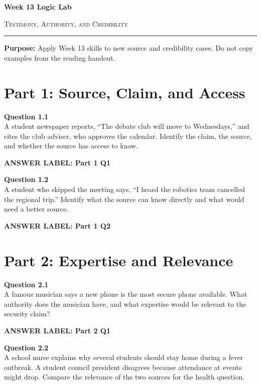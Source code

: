 \documentclass[12pt]{article}
\newcommand{\answerbox}[2]{%
\vspace{0.15em}
\noindent\textbf{#1}\par
\vspace{0.05em}
\noindent\fbox{%
\begin{minipage}[t][#2]{\dimexpr\textwidth-2\fboxsep-2\fboxrule}
\rule{\textwidth}{0pt}
\vspace{#2}
\end{minipage}
}\par
\vspace{0.25em}
}
\begin{document}
\begin{center}
{\LARGE\bfseries Week 13 Logic Lab}\par\vspace{0.05em}
{\large\scshape Testimony, Authority, and Credibility}\par\vspace{0.1em}
\rule{0.78\textwidth}{0.5pt}\par\vspace{0.15em}
\end{center}

\noindent\textbf{Purpose:} Apply Week 13 skills to new source and credibility cases. Do not copy examples from the reading handout.

\vspace{0.3em}

\section*{Part 1: Source, Claim, and Access}

\textbf{Question 1.1}\\[-0.15em]
A student newspaper reports, ``The debate club will move to Wednesdays,'' and cites the club adviser, who approves the calendar. Identify the claim, the source, and whether the source has access to know.

\answerbox{ANSWER LABEL: Part 1 Q1}{2.25in}

\textbf{Question 1.2}\\[-0.15em]
A student who skipped the meeting says, ``I heard the robotics team cancelled the regional trip.'' Identify what the source can know directly and what would need a better source.

\answerbox{ANSWER LABEL: Part 1 Q2}{2.25in}

\newpage

\section*{Part 2: Expertise and Relevance}

\textbf{Question 2.1}\\[-0.15em]
A famous musician says a new phone is the most secure phone available. What authority does the musician have, and what expertise would be relevant to the security claim?

\answerbox{ANSWER LABEL: Part 2 Q1}{2.45in}

\textbf{Question 2.2}\\[-0.15em]
A school nurse explains why several students should stay home during a fever outbreak. A student council president disagrees because attendance at events might drop. Compare the relevance of the two sources for the health question.
\end{document}
